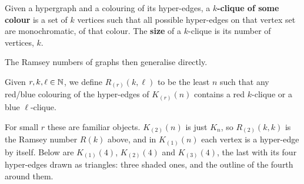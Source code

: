 \begin{boxdefinition}[$k$-clique]
    Given a hypergraph and a colouring of its hyper-edges, a \textbf{$k$-clique of some colour} is a set  of $k$ vertices such that all possible hyper-edges on that vertex set are monochromatic, of that colour. The \textbf{size} of a $k$-clique is its number of vertices, $k$.
\end{boxdefinition}

The Ramsey numbers of graphs then generalise directly.

\begin{boxdefinition}
    Given $r, k, \ell \in \mathbb{N}$, we define $R_{(r)}(k, \ell)$ to be the least $n$ such that any red/blue colouring of the hyper-edges of $K_{(r)}(n)$ contains a red $k$-clique or a blue $\ell$-clique.
\end{boxdefinition}

For small $r$ these are familiar objects. $K_{(2)}(n)$ is just $K_n$, so $R_{(2)}(k, k)$ is the Ramsey number $R(k)$ above, and in $K_{(1)}(n)$ each vertex is a hyper-edge by itself. Below are $K_{(1)}(4)$, $K_{(2)}(4)$ and $K_{(3)}(4)$, the last with its four hyper-edges drawn as triangles: three shaded ones, and the outline of the fourth around them.

